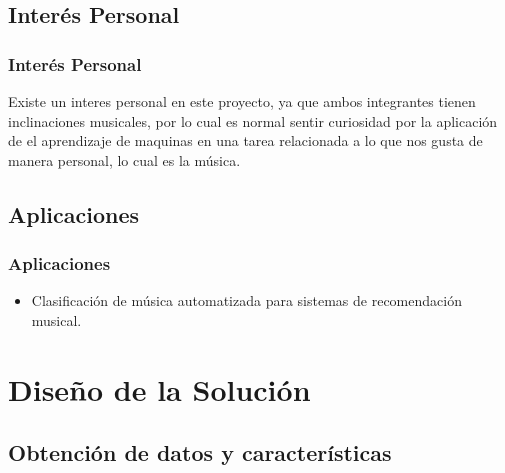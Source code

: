 \documentclass{beamer}
\begin{document}
\subsection{Inter\'{e}s Personal} %

\begin{frame}
\frametitle{Inter\'{e}s Personal}
Existe un interes personal en este proyecto, ya que ambos integrantes tienen inclinaciones musicales, por lo cual es normal sentir curiosidad por la aplicaci\'{o}n de el aprendizaje de maquinas
en una tarea relacionada a lo que nos gusta de manera personal, lo cual es la m\'{u}sica. 
\end{frame}

\subsection{Aplicaciones} %

\begin{frame}
\frametitle{Aplicaciones}
\begin{itemize}
\item Clasificaci\'{o}n de m\'{u}sica automatizada para sistemas de recomendaci\'{o}n musical.
\end{itemize}
\end{frame}


\section{Dise\~{n}o de la Soluci\'{o}n} %

\subsection{Obtenci\'{o}n de datos y caracter\'{i}sticas} %
\end{document}
